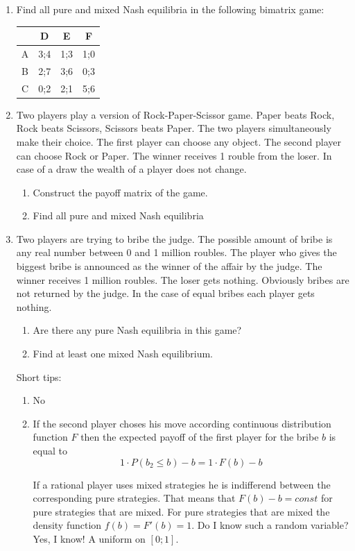 \documentclass[12pt]{article} %
\theoremstyle{definition} %
\begin{document}
\begin{enumerate}[resume]
\item Find all pure and mixed Nash equilibria in the following bimatrix game:


\begin{tabular}{c|ccc}
 & D & E & F \\
\hline
A & 3;4 & 1;3 & 1;0  \\
B & 2;7 & 3;6 & 0;3  \\
C & 0;2 & 2;1 & 5;6  \\
\end{tabular}
\item Two players play a version of Rock-Paper-Scissor game. Paper beats Rock, Rock beats Scissors, Scissors beats Paper. The two players simultaneously make their choice. The first player can choose any object. The second player can choose Rock or Paper. The winner receives 1 rouble from the loser. In case of a draw the wealth of a player does not change.
\begin{enumerate}
\item Construct the payoff matrix of the game.
\item Find all pure and mixed Nash equilibria
\end{enumerate}
\item Two players are trying to bribe the judge. The possible amount of bribe is any real number between 0 and 1 million roubles. The player who gives the biggest bribe is announced as the winner of the affair by the judge. The winner receives 1 million roubles. The loser gets nothing. Obviously bribes are not returned by the judge. In the case of equal bribes each player gets nothing.
\begin{enumerate}
\item Are there any pure Nash equilibria in this game?
\item Find at least one mixed Nash equilibrium.
\end{enumerate}

Short tips:
\begin{enumerate}
\item No
\item If the second player choses his move according continuous distribution function $F$ then the expected payoff of the first player for the bribe $b$ is equal to
\[
1\cdot P(b_2 \leq b) - b = 1\cdot F(b)-b
\]

If a rational player uses mixed strategies he is indifferend between the corresponding pure strategies. That means that $F(b)-b=const$ for pure strategies that are mixed. For pure strategies that are mixed the density function $f(b)=F'(b)=1$. Do I know such a random variable? Yes, I know! A uniform on $[0;1]$.

\end{enumerate}

\end{enumerate}
\end{document}
